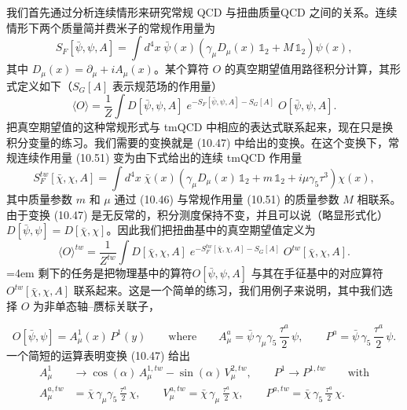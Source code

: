 我们首先通过分析连续情形来研究常规 QCD 与扭曲质量QCD 之间的关系。连续情形下两个质量简并费米子的常规作用量为
\begin{equation}
  S_F[\bar\psi, \psi, A] = \int d^4x\;
  \bar\psi(x)\left(\gamma_\mu D_\mu(x)\,\mathbb{1}_2
  + M\,\mathbb{1}_2\right)\psi(x) ,
\end{equation}
其中 $D_\mu(x) = \partial_\mu + iA_\mu(x)$。某个算符 $O$ 的真空期望值用路径积分计算，其形式定义如下（$S_G[A]$ 表示规范场的作用量）
\begin{equation}
  \langle O\rangle = \frac{1}{Z}
  \int D[\bar\psi, \psi, A]\;
  e^{-S_F[\bar\psi,\psi,A] - S_G[A]}\; O[\bar\psi, \psi, A] .
\end{equation}
把真空期望值的这种常规形式与 tmQCD 中相应的表达式联系起来，现在只是换积分变量的练习。我们需要的变换就是 (10.47) 中给出的变换。在这个变换下，常规连续作用量 (10.51) 变为由下式给出的连续 tmQCD 作用量
\begin{equation}
  S_F^{tw}[\bar\chi, \chi, A] = \int d^4x\;
  \bar\chi(x)\left(\gamma_\mu D_\mu(x)\,\mathbb{1}_2
  + m\,\mathbb{1}_2 + i\mu\gamma_5\tau^3\right)\chi(x) ,
\end{equation}
其中质量参数 $m$ 和 $\mu$ 通过 (10.46) 与常规作用量 (10.51) 的质量参数 $M$ 相联系。由于变换 (10.47) 是无反常的，积分测度保持不变，并且可以说（略显形式化）$D[\bar\psi, \psi] = D[\bar\chi, \chi]$。因此我们把扭曲基中的真空期望值定义为
\begin{equation}
  \langle O\rangle^{tw} = \frac{1}{Z^{tw}}
  \int D[\bar\chi, \chi, A]\;
  e^{-S_F^{tw}[\bar\chi,\chi,A] - S_G[A]}\;
  O^{tw}[\bar\chi, \chi, A] .
\end{equation}
\begingroup\emergencystretch=4em 剩下的任务是把物理基中的算符\linebreak[0] $O[\bar\psi, \psi, A]$ 与其在手征基中的对应算符 $O^{tw}[\bar\chi, \chi, A]$ 联系起来。这是一个简单的练习，我们用例子来说明，其中我们选择 $O$ 为非单态轴--赝标关联子，\par\endgroup
\begin{equation}
  O[\bar\psi, \psi] = A^1_\mu(x)\,P^1(y)
  \qquad \text{where} \qquad
  A^a_\mu = \bar\psi\,\gamma_\mu\gamma_5\,\frac{\tau^a}{2}\,\psi , \qquad
  P^a = \bar\psi\,\gamma_5\,\frac{\tau^a}{2}\,\psi .
\end{equation}
一个简短的运算表明变换 (10.47) 给出
\begin{equation}
  \begin{aligned}
    A^{1}_\mu &\to \cos(\alpha)\,A^{1,tw}_\mu - \sin(\alpha)\,V^{2,tw}_\mu ,
    \qquad P^{1} \to P^{1,tw} \qquad \text{with} \\
    A^{a,tw}_\mu &= \bar\chi\,\gamma_\mu\gamma_5\,\frac{\tau^a}{2}\,\chi ,
    \qquad
    V^{a,tw}_\mu = \bar\chi\,\gamma_\mu\,\frac{\tau^a}{2}\,\chi , \qquad
    P^{a,tw} = \bar\chi\,\gamma_5\,\frac{\tau^a}{2}\,\chi .
  \end{aligned}
\end{equation}
